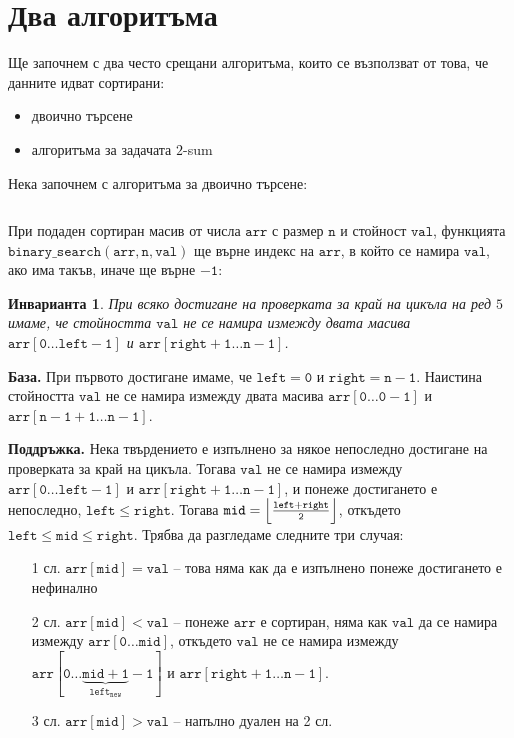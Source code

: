 \documentclass{article}
\theoremstyle{definition}
\theoremstyle{plain}
\newtheorem*{invariant}{Инварианта}
\theoremstyle{remark}
\theoremstyle{definition}
\begin{document}
\section*{Два алгоритъма}

Ще започнем с два често срещани алгоритъма, които се възползват от това, че данните идват сортирани:
\begin{itemize}
    \item двоично търсене
    \item алгоритъма за задачата $2$-sum
\end{itemize}

Нека започнем с алгоритъма за двоично търсене:
\inputminted[linenos]{c++}{algorithms/binary_search.cpp}

При подаден сортиран масив от числа $\mathtt{arr}$ с размер $\mathtt{n}$ и стойност $\mathtt{val}$, функцията $\mathtt{binary\_search(arr, n, val)}$ ще върне индекс на $\mathtt{arr}$, в който се намира $\mathtt{val}$, ако има такъв, иначе ще върне $\mathtt{-1}$:
\begin{invariant}
    При всяко достигане на проверката за край на цикъла на ред $5$ имаме, че стойността $\mathtt{val}$ не се намира измежду двата масива $\mathtt{arr[0 \dots left - 1]}$ и $\mathtt{arr[right + 1 \dots n - 1]}$.
\end{invariant}

\textbf{База.}
При първото достигане имаме, че $\mathtt{left = 0}$ и $\mathtt{right = n - 1}$.
Наистина стойността $\mathtt{val}$ не се намира измежду двата масива $\mathtt{arr[0 \dots 0 -1]}$ и $\mathtt{arr[n - 1 + 1 \dots n - 1]}$.

\textbf{Поддръжка.}
Нека твърдението е изпълнено за някое непоследно достигане на проверката за край на цикъла.
Тогава $\mathtt{val}$ не се намира измежду $\mathtt{arr[0 \dots left - 1]}$ и $\mathtt{arr[right + 1 \dots n - 1]}$, и понеже достигането е непоследно, $\mathtt{left \leq right}$.
Тогава $\mathtt{mid = \Bigl\lfloor \frac{left + right}{2} \Bigr\rfloor}$, откъдето $\mathtt{left \leq mid \leq right}$.
Трябва да разгледаме следните три случая:
\begin{itemize}
    \item[1 сл.] $\mathtt{arr[mid] = val}$ -- това няма как да е изпълнено понеже достигането е нефинално
    \item[2 сл.] $\mathtt{arr[mid] < val}$ -- понеже $\mathtt{arr}$ е сортиран, няма как $\mathtt{val}$ да се намира измежду $\mathtt{arr[0 \dots mid]}$, откъдето $\mathtt{val}$ не се намира измежду $\mathtt{arr[0 \dots \underbrace{\mathtt{mid + 1}}_{left_{new}} - 1]}$ и $\mathtt{arr[right + 1 \dots n - 1]}$.
    \item[3 сл.] $\mathtt{arr[mid] > val}$ -- напълно дуален на 2 сл.
\end{itemize}
\end{document}
